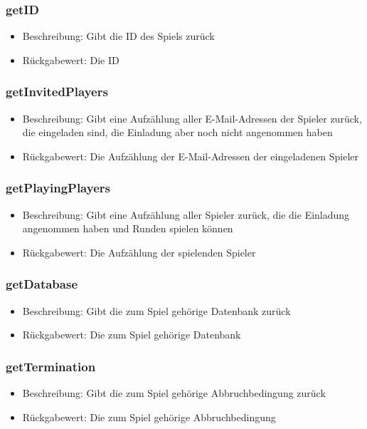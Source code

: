 \documentclass[a4paper]{scrreprt}
\begin{document}
	\subsubsection{getID}
		\begin{itemize}
		\item Beschreibung: Gibt die ID des Spiels zurück
		\item Rückgabewert: Die ID
		\end{itemize}
	\subsubsection{getInvitedPlayers}
		\begin{itemize}
			\item Beschreibung: Gibt eine Aufzählung aller E-Mail-Adressen der Spieler zurück, die eingeladen sind, die Einladung aber noch nicht angenommen haben
			\item Rückgabewert: Die Aufzählung der E-Mail-Adressen der eingeladenen Spieler
		\end{itemize}
	\subsubsection{getPlayingPlayers}
		\begin{itemize}
			\item Beschreibung: Gibt eine Aufzählung aller Spieler zurück, die die Einladung angenommen haben und Runden spielen können
			\item Rückgabewert: Die Aufzählung der spielenden Spieler
		\end{itemize}
	\subsubsection{getDatabase}
	\begin{itemize}
	\item Beschreibung: Gibt die zum Spiel gehörige Datenbank zurück
	\item Rückgabewert: Die zum Spiel gehörige Datenbank
	\end{itemize}
	\subsubsection{getTermination}
	\begin{itemize}
		\item Beschreibung: Gibt die zum Spiel gehörige Abbruchbedingung zurück
		\item Rückgabewert: Die zum Spiel gehörige Abbruchbedingung
		\end{itemize}
\end{document}
